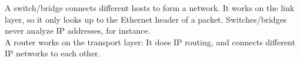 A switch/bridge connects different hosts to form a network. It works on the link layer, so it only looks up to the Ethernet header of a packet. Switches/bridges never analyze IP addresses, for instance. \\
A router works on the transport layer: It does IP routing, and connects different IP networks to each other.